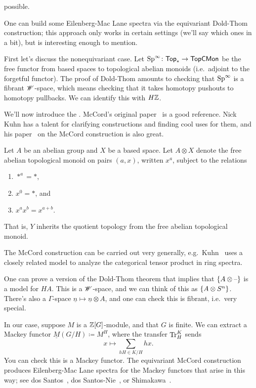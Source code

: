 possible.
\begin{cons}
\label{EMcons}
One can build some Eilenberg-Mac Lane spectra via the equivariant Dold-Thom construction; this approach only works
in certain settings (we'll say which ones in a bit), but is interesting enough to mention.

First let's discuss the nonequivariant case. Let $\mathrm{Sp}^\infty\colon\mathsf{Top}_*\to\mathsf{TopCMon}$ be the free functor from
based spaces to topological abelian monoids (i.e.\ adjoint to the forgetful functor). The proof of Dold-Thom
amounts to checking that $\mathrm{Sp}^\infty$ is a fibrant $\mathscr W$-space, which means checking that it takes homotopy
pushouts to homotopy pullbacks. We can identify this with $H\mathbb Z$.

We'll now introduce the . McCord's original paper~\cite{McCord} is a good reference. Nick
Kuhn has a talent for clarifying constructions and finding cool uses for them, and his paper~\cite{KuhnMcCord} on
the McCord construction is also great.

Let $A$ be an abelian group and $X$ be a based space. Let $A\otimes X$ denote the free abelian topological monoid
on pairs $(a,x)$, written $x^a$, subject to the relations
\begin{enumerate}
	\item $*^a = *$,
	\item $x^0 = *$, and
	\item $x^ax^b = x^{a+b}$.
\end{enumerate}
That is, $Y$ inherits the quotient topology from the free abelian topological monoid.
\begin{rem}
The McCord construction can be carried out very generally, e.g.\ Kuhn~\cite{KuhnMcCord} uses a closely related
model to analyze the categorical tensor product in ring spectra.
\end{rem}
One can prove a version of the Dold-Thom theorem that implies that $\{A\otimes\text{--}\}$ is a model for $HA$. This is
a $\mathscr W$-space, and we can think of this as $\{A\otimes S^n\}$. There's also a $\Gamma$-space $\underline n\mapsto
\underline n\otimes A$, and one can check this is fibrant, i.e.\ very special.

In our case, suppose $M$ is a $\mathbb Z[G]$-module, and that $G$ is finite. We can extract a Mackey functor $\underline
M(G/H)\coloneqq M^H$, where the transfer $\operatorname{Tr}_H^K$ sends
\[x\mapsto \sum_{hH\in K/H} hx.\]
You can check this is a Mackey functor. The equivariant McCord construction produces Eilenberg-Mac Lane spectra for
the Mackey functors that arise in this way; see dos Santos~\cite{dosSantos}, dos Santos-Nie~\cite{dSN09}, or
Shimakawa~\cite{Shi89}.


\end{cons}
